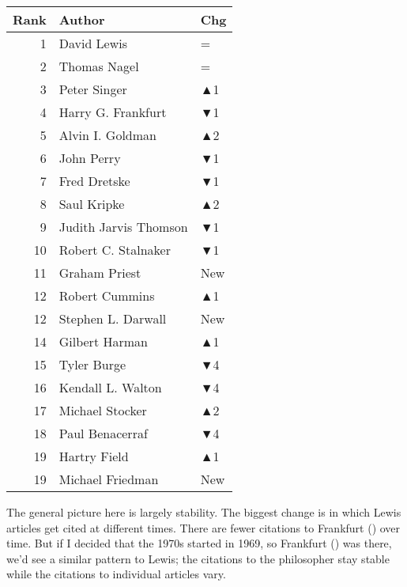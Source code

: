 \documentclass[
  10pt,
  letterpaper,
  DIV=11,
  numbers=noendperiod,
  twoside]{scrartcl}
\begin{document}
\begin{table}
\begin{minipage}{0.20\linewidth}
{\begin{tabular}{rll}
\toprule
Rank & Author & Chg\\
\midrule
1 & David Lewis & =\\
2 & Thomas Nagel & =\\
3 & Peter Singer & \textcolor[RGB]{34,178,34}{▲1}\\
4 & Harry G. Frankfurt & \textcolor[RGB]{178,34,34}{▼1}\\
5 & Alvin I. Goldman & \textcolor[RGB]{34,178,34}{▲2}\\
6 & John Perry & \textcolor[RGB]{178,34,34}{▼1}\\
7 & Fred Dretske & \textcolor[RGB]{178,34,34}{▼1}\\
8 & Saul Kripke & \textcolor[RGB]{34,178,34}{▲2}\\
9 & Judith Jarvis Thomson & \textcolor[RGB]{178,34,34}{▼1}\\
10 & Robert C. Stalnaker & \textcolor[RGB]{178,34,34}{▼1}\\
11 & Graham Priest & \textcolor[RGB]{34,178,34}{New}\\
12 & Robert Cummins & \textcolor[RGB]{34,178,34}{▲1}\\
12 & Stephen L. Darwall & \textcolor[RGB]{34,178,34}{New}\\
14 & Gilbert Harman & \textcolor[RGB]{34,178,34}{▲1}\\
15 & Tyler Burge & \textcolor[RGB]{178,34,34}{▼4}\\
16 & Kendall L. Walton & \textcolor[RGB]{178,34,34}{▼4}\\
17 & Michael Stocker & \textcolor[RGB]{34,178,34}{▲2}\\
18 & Paul Benacerraf & \textcolor[RGB]{178,34,34}{▼4}\\
19 & Hartry Field & \textcolor[RGB]{34,178,34}{▲1}\\
19 & Michael Friedman & \textcolor[RGB]{34,178,34}{New}\\
\bottomrule
\end{tabular}

}

\end{minipage}%

\end{table}%

The general picture here is largely stability. The biggest change is in
which Lewis articles get cited at different times. There are fewer
citations to Frankfurt () over time.
But if I decided that the 1970s started in 1969, so Frankfurt
() was there, we'd see a similar
pattern to Lewis; the citations to the philosopher stay stable while the
citations to individual articles vary.
\end{document}
